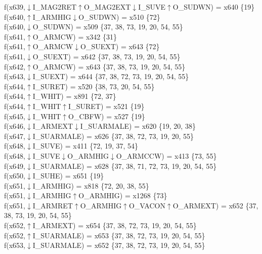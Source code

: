 f(x639,$\downarrow$I\_MAG2RET$\uparrow$O\_MAG2EXT$\downarrow$I\_SUVE$\uparrow$O\_SUDWN) = x640 \{19\} \\  
f(x640,$\uparrow$I\_ARMHIG$\downarrow$O\_SUDWN) = x510 \{72\} \\  
f(x640,$\downarrow$O\_SUDWN) = x509 \{37, 38, 73, 19, 20, 54, 55\} \\  
f(x641,$\uparrow$O\_ARMCW) = x342 \{31\} \\  
f(x641,$\uparrow$O\_ARMCW$\downarrow$O\_SUEXT) = x643 \{72\} \\  
f(x641,$\downarrow$O\_SUEXT) = x642 \{37, 38, 73, 19, 20, 54, 55\} \\  
f(x642,$\uparrow$O\_ARMCW) = x643 \{37, 38, 73, 19, 20, 54, 55\} \\  
f(x643,$\downarrow$I\_SUEXT) = x644 \{37, 38, 72, 73, 19, 20, 54, 55\} \\  
f(x644,$\uparrow$I\_SURET) = x520 \{38, 73, 20, 54, 55\} \\  
f(x644,$\uparrow$I\_WHIT) = x891 \{72, 37\} \\  
f(x644,$\uparrow$I\_WHIT$\uparrow$I\_SURET) = x521 \{19\} \\  
f(x645,$\downarrow$I\_WHIT$\uparrow$O\_CBFW) = x527 \{19\} \\  
f(x646,$\downarrow$I\_ARMEXT$\downarrow$I\_SUARMALE) = x620 \{19, 20, 38\} \\  
f(x647,$\downarrow$I\_SUARMALE) = x626 \{37, 38, 72, 73, 19, 20, 55\} \\  
f(x648,$\downarrow$I\_SUVE) = x411 \{72, 19, 37, 54\} \\  
f(x648,$\downarrow$I\_SUVE$\downarrow$O\_ARMHIG$\downarrow$O\_ARMCCW) = x413 \{73, 55\} \\  
f(x649,$\downarrow$I\_SUARMALE) = x628 \{37, 38, 71, 72, 73, 19, 20, 54, 55\} \\  
f(x650,$\downarrow$I\_SUHE) = x651 \{19\} \\  
f(x651,$\downarrow$I\_ARMHIG) = x818 \{72, 20, 38, 55\} \\  
f(x651,$\downarrow$I\_ARMHIG$\uparrow$O\_ARMHIG) = x1268 \{73\} \\  
f(x651,$\downarrow$I\_ARMRET$\uparrow$O\_ARMHIG$\uparrow$O\_VACON$\uparrow$O\_ARMEXT) = x652 \{37, 38, 73, 19, 20, 54, 55\} \\  
f(x652,$\uparrow$I\_ARMEXT) = x654 \{37, 38, 72, 73, 19, 20, 54, 55\} \\  
f(x652,$\uparrow$I\_SUARMALE) = x653 \{37, 38, 72, 73, 19, 20, 54, 55\} \\  
f(x653,$\downarrow$I\_SUARMALE) = x652 \{37, 38, 72, 73, 19, 20, 54, 55\} \\  
